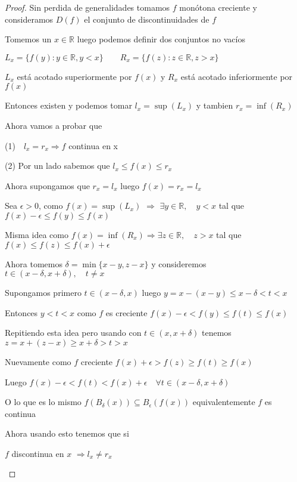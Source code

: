 \documentclass[12pt]{article}
\newcommand{\R}{\mathbb{R}}
\newcommand{\Ra}{\Rightarrow}
\theoremstyle{definition}
\begin{document}
\begin{proof}
  Sin perdida de generalidades tomamos $f$ monótona creciente y consideramos $D(f)$ el conjunto de discontinuidades de $f$

  Tomemos un $x \in \R$ luego podemos definir dos conjuntos no vacíos

  \begin{center} $ L_{x} = \{ f(y) : y \in \R, y<x\} \quad \quad      R_{x} = \{f(z): z \in \R, z>x \}$ \end{center}

  $L_{x}$ está acotado superiormente por $f(x)$ y $R_{x}$ está acotado inferiormente por $f(x)$

  Entonces existen y podemos tomar $l_{x} = \sup (L_{x})$ y tambien $r_{x} = \inf(R_{x})$

  Ahora vamos a probar que \begin{center} (1)$ \quad l_{x} = r_{x} \Ra f$ continua en x \end{center}

  (2) Por un lado sabemos que $ l_{x} \leq f(x) \leq r_{x}$

  Ahora supongamos que $r_{x} = l_{x}$ luego $f(x) = r_{x} = l_{x}$

  Sea $\epsilon  > 0$, como $f(x) = \sup(L_{x})$ $\Ra$ $\exists y \in \R , \quad y < x$ tal que $f(x) - \epsilon \leq f(y) \leq f(x)$

  Misma idea como $f(x) = \inf(R_{x}) \Ra \exists z \in \R,  \quad z > x$ tal que $ f(x) \leq f(z) \leq f(x) + \epsilon$

  Ahora tomemos $\delta = \min\{x - y , z -x \}$ y consideremos $t \in (x - \delta , x + \delta ), \quad t \neq x$

  Supongamos primero $t \in (x - \delta , x)$ luego $y = x - (x - y) \leq x - \delta < t < x$ 

  Entonces $y < t < x $ como $f$ es creciente $ f(x) - \epsilon < f(y) \leq f(t) \leq f(x) $

  Repitiendo esta idea pero usando con $t \in (x , x + \delta)$ tenemos $z = x + (z - x) \geq x + \delta > t > x $ 

  Nuevamente como $f$ creciente $f(x) + \epsilon > f(z) \geq f(t) \geq f(x)$

  Luego $f(x) - \epsilon < f(t) < f(x) + \epsilon \quad \forall t \in (x - \delta , x + \delta)$

  O lo que es lo mismo $f(B_{\delta}(x)) \subseteq B_{\epsilon}(f(x))$ equivalentemente $f$ es continua
 
  Ahora usando esto tenemos que si \begin{center} $f$ discontinua en $x$ $\Ra l_{x} \neq r_{x}$ \end{center}


\end{proof}
\end{document}
